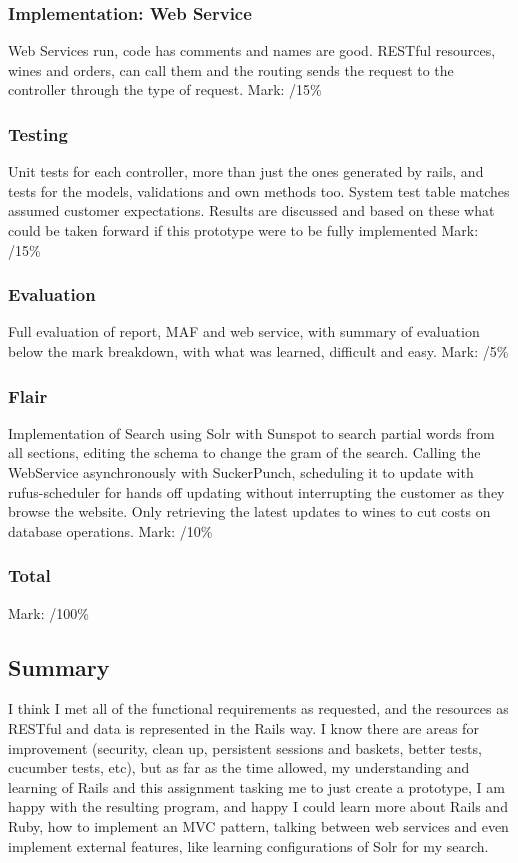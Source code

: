 \documentclass[12pt]{article}
\begin{document}
\subsubsection{Implementation: Web Service}
Web Services run, code has comments and names are good. RESTful resources, wines and orders, can call them and the routing sends the request to the controller through the type of request.
Mark: /15\%

\subsubsection{Testing}
Unit tests for each controller, more than just the ones generated by rails, and tests for the models, validations and own methods too. System test table matches assumed customer expectations. Results are discussed and based on these what could be taken forward if this prototype were to be fully implemented
Mark: /15\%

\subsubsection{Evaluation}
Full evaluation of report, MAF and web service, with summary of evaluation below the mark breakdown, with what was learned, difficult and easy.
Mark: /5\%

\subsubsection{Flair}
Implementation of Search using Solr with Sunspot to search partial words from all sections, editing the schema to change the gram of the search. Calling the WebService asynchronously with SuckerPunch, scheduling it to update with rufus-scheduler for hands off updating without interrupting the customer as they browse the website. Only retrieving the latest updates to wines to cut costs on database operations.
Mark: /10\%

\subsubsection{Total}
Mark: /100\%

\subsection{Summary}
I think I met all of the functional requirements as requested, and the resources as RESTful and data is represented in the Rails way. I know there are areas for improvement (security, clean up, persistent sessions and baskets, better tests, cucumber tests, etc), but as far as the time allowed, my understanding and learning of Rails and this assignment tasking me to just create a prototype, I am happy with the resulting program, and happy I could learn more about Rails and Ruby, how to implement an MVC pattern, talking between web services and even implement external features, like learning configurations of Solr for my search.
\end{document}
